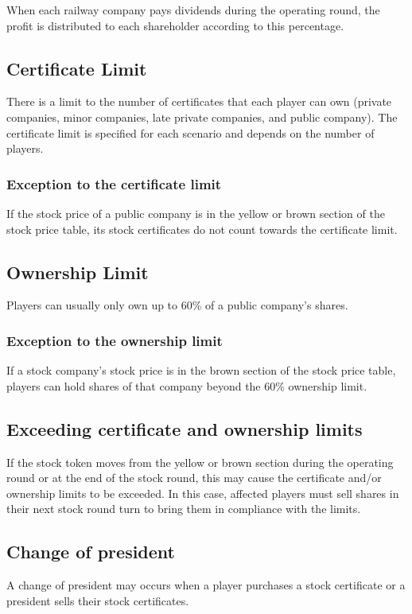 \documentclass{article}
\begin{document}
\begin{CJK}{UTF8}{min}
When each railway company pays dividends during the operating round,
the profit is distributed to each shareholder according to this
percentage.

\subsection{Certificate Limit}
There is a limit to the number of certificates that each player can
own (private companies, minor companies, late private companies, and
public company). The certificate limit is specified for each scenario
and depends on the number of players.

\subsubsection{Exception to the certificate limit}
\label{sec:certificate-limit-exceptions}
If the stock price of a public company is in the yellow or brown
section of the stock price table, its stock certificates do not count
towards the certificate limit.

\subsection{Ownership Limit}
Players can usually only own up to 60\% of a public company's
shares.

\subsubsection{Exception to the ownership limit}
\label{sec:ownership-limit-exceptions}
If a stock company's stock price is in the brown section of the stock
price table, players can hold shares of that company beyond the 60\%
ownership limit.

\subsection{Exceeding certificate and ownership limits}
If the stock token moves from the yellow or brown section during the
operating round or at the end of the stock round, this may cause the
certificate and/or ownership limits to be exceeded. In this case,
affected players must sell shares in their next stock round turn to
bring them in compliance with the limits.

\subsection{Change of president}
A change of president may occurs when a player purchases a stock
certificate or a president sells their stock certificates.


\end{CJK}
\end{document}
